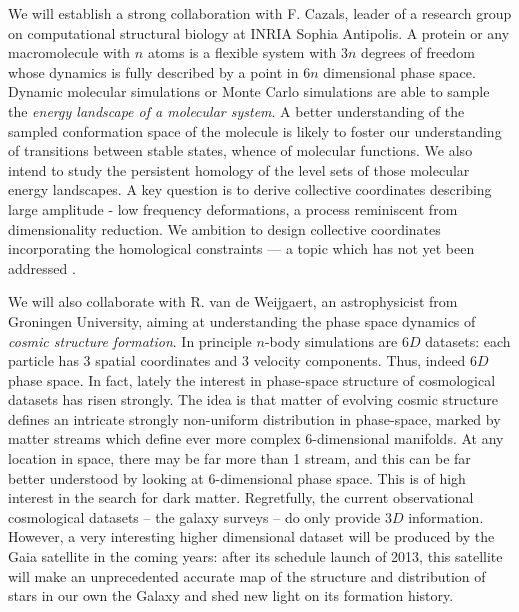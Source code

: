 
We will establish a strong collaboration with F. Cazals, leader of a
research group on computational structural biology at INRIA Sophia
Antipolis. A protein or any macromolecule with $n$ atoms is a flexible
system with $3n$ degrees of freedom whose dynamics is fully described
by a point in $6n$ dimensional phase space. Dynamic molecular
simulations or Monte Carlo simulations are able to sample the {\em energy
landscape of a molecular system}. A better understanding of the
sampled conformation space of the molecule is likely to
foster our understanding of transitions between stable states,
whence of molecular functions.
We also intend to study the persistent homology
of the level sets of those molecular energy landscapes. A key question
 is to derive collective coordinates describing large amplitude -
low frequency deformations, a process reminiscent from dimensionality
reduction. We ambition to design collective coordinates incorporating
the homological constraints --- a topic which has not yet been
addressed \cite{djw-el-2003}. 

We will also collaborate with R. van de Weijgaert, an astrophysicist from
Groningen University, aiming at understanding the  phase space dynamics of
{\em cosmic structure formation}. In principle $n$-body simulations are
$6D$ datasets: each particle has 3 spatial coordinates and 3 velocity components.
Thus, indeed $6D$ phase space. In fact, lately the interest in phase-space structure
of cosmological datasets has risen strongly. The idea is that matter of evolving cosmic
structure defines an intricate strongly non-uniform distribution in phase-space,
marked by matter streams which define ever more complex $6$-dimensional
manifolds. At any location in space, there may be far more than 1 stream, and this
can be far better understood by looking at $6$-dimensional phase space. This is of high
interest in the search for dark matter. Regretfully, the current observational
cosmological datasets -- the galaxy surveys -- do only provide $3D$ information.
However, a very interesting higher dimensional dataset will be produced by
the Gaia satellite in the coming years: after its schedule launch of 2013, this satellite
will make an unprecedented accurate map of the structure and distribution of
stars in our own the Galaxy and shed new light on its formation
history. 

